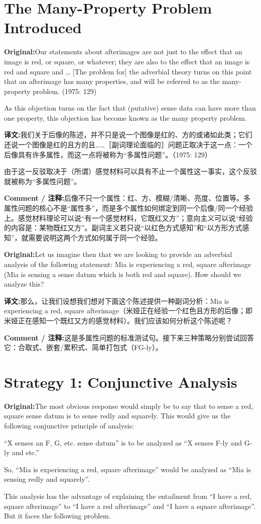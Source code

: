 \documentclass[11pt,a4paper]{article}
\newcommand{\eng}[1]{\begin{engbox}\noindent\textbf{Original:}\quad #1\end{engbox}}
\newcommand{\cn}[1]{\begin{cnbox}\noindent\textbf{译文:}\quad #1\end{cnbox}}
\newcommand{\cmt}[1]{\begin{commentbox}\noindent\textbf{Comment / 注释:}\quad #1\end{commentbox}}
\begin{document}
\section{The Many-Property Problem Introduced}

\eng{Our statements about afterimages are not just to the effect that an image is red, or square, or whatever; they are also to the effect that an image is red and square and … [The problem for] the adverbial theory turns on this point that an afterimage has many properties, and will be referred to as the many-property problem. (1975: 129)

As this objection turns on the fact that (putative) sense data can have more than one property, this objection has become known as the many property problem.}

\cn{我们关于后像的陈述，并不只是说一个图像是红的、方的或诸如此类；它们还说一个图像是红的且方的且……［副词理论面临的］问题正取决于这一点：一个后像具有许多属性，而这一点将被称为“多属性问题”。（1975: 129）

由于这一反驳取决于（所谓）感觉材料可以具有不止一个属性这一事实，这个反驳就被称为“多属性问题”。}

\cmt{后像不只一个属性：红、方、模糊/清晰、亮度、位置等。多属性问题的核心不是“属性多”，而是多个属性如何绑定到同一个后像/同一个经验上。感觉材料理论可以说“有一个感觉材料，它既红又方”；意向主义可以说“经验的内容是：某物既红又方”。副词主义若只说“以红色方式感知”和“以方形方式感知”，就需要说明这两个方式如何属于同一个经验。}

\eng{Let us imagine then that we are looking to provide an adverbial analysis of the following statement: Mia is experiencing a red, square afterimage (Mia is sensing a sense datum which is both red and square). How should we analyze this?}

\cn{那么，让我们设想我们想对下面这个陈述提供一种副词分析：Mia is experiencing a red, square afterimage（米娅正在经验一个红色且方形的后像；即米娅正在感知一个既红又方的感觉材料）。我们应该如何分析这个陈述呢？}

\cmt{这是多属性问题的标准测试句。接下来三种策略分别尝试回答它：合取式、嵌套/累积式、简单打包式（FG-ly）。}

\section{Strategy 1: Conjunctive Analysis}

\eng{The most obvious response would simply be to say that to sense a red, square sense datum is to sense redly and squarely. This would give us the following conjunctive principle of analysis:

“X senses an F, G, etc. sense datum” is to be analyzed as “X senses F-ly and G-ly and etc.”

So, “Mia is experiencing a red, square afterimage” would be analyzed as “Mia is sensing redly and squarely”.

This analysis has the advantage of explaining the entailment from “I have a red, square afterimage” to “I have a red afterimage” and “I have a square afterimage”. But it faces the following problem.}
\end{document}
